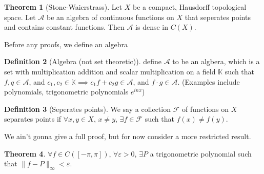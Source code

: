 \documentclass[13pt]{article}
\theoremstyle{definition} --- default
\newtheorem{theorem}{Theorem}
\theoremstyle{definition}
\newtheorem{definition}[theorem]{Definition}
\theoremstyle{remark}
\begin{document}
\begin{theorem}[Stone-Waierstrass]
    Let $X$ be a compact, Hausdorff topological space. Let $\mathcal{A}$ be an algebra of continuous functions on $X$ that seperates points and contains constant functions. Then $\mathcal{A}$ is dense in $C(X)$.

    
\end{theorem}
Before any proofs, we define an algebra
\begin{definition}[Algebra (not set theoretic)]
    define $\mathcal{A}$ to be an algbera, which is a set with multiplication addition and scalar multiplication on a field $\mathbb{K}$ such that $f, q \in \mathcal{A}$, and $c_1, c_2 \in \mathbb{K} \implies c_1 f + c_2 g \in \mathcal{A}$, and $f \cdot g \in \mathcal{A}$. (Examples include polynomials, trigonometric polynomials $e^{inx}$)
    
\end{definition}
\begin{definition}[Seperates points]
    We say a collection $\mathcal{F}$ of functions on $X$ separates points if $\forall x,y \in X$, $x \neq y$, $\exists f \in \mathcal{F}$ such that $f(x) \neq f(y)$. 
    
\end{definition}
We ain't gonna give a full proof, but for now consider a more restricted result. 
\begin{theorem}
    $\forall f \in C([-\pi,\pi])$, $\forall \varepsilon >0$, $\exists P$ a trigonometric polynomial such that $\|f - P\|_\infty < \varepsilon$. 
\end{theorem}
\end{document}
